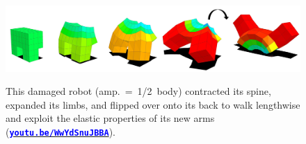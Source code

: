 \begin{figure}[h!]
\begin{center}
\includegraphics[trim={0 0 0 0},clip,width=\linewidth]{Chapter05/fig/Flipper2.jpg}\\
\caption{\label{fig5:flipper}
This damaged robot (amp.~=~1/2~body) contracted its spine, expanded its limbs, and flipped over onto its back to walk lengthwise and exploit the elastic properties of its new arms
(\href{https://youtu.be/WwYdSnuJBBA}{\textcolor{blue}{\textbf{\texttt{youtu.be/WwYdSnuJBBA}}}}).
}
\vspace{-1em}
\end{center}
\end{figure}